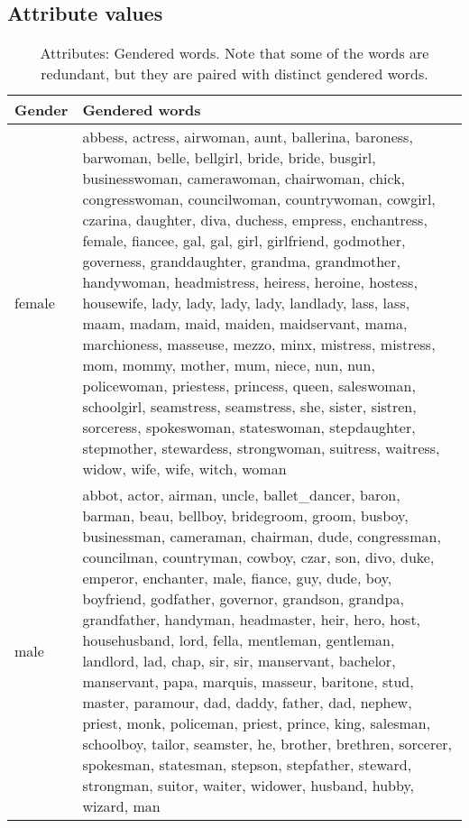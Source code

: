 {\renewcommand{\arraystretch}{1.5}
\subsection{Attribute values} \label{attribute-values}
\begin{table}[!htb]
    \small
    \centering
    \begin{tabular}{|p{}|p{}|}
    \hline
    \textbf{Gender} & \textbf{Gendered words}                        \\
    \hline    
    female          & abbess, actress, airwoman, aunt, ballerina, baroness, barwoman, belle, bellgirl, bride, bride, busgirl, businesswoman, camerawoman, chairwoman, chick, congresswoman, councilwoman, countrywoman, cowgirl, czarina, daughter, diva, duchess, empress, enchantress, female, fiancee, gal, gal, girl, girlfriend, godmother, governess, granddaughter, grandma, grandmother, handywoman, headmistress, heiress, heroine, hostess, housewife, lady, lady, lady, lady, landlady, lass, lass, maam, madam, maid, maiden, maidservant, mama, marchioness, masseuse, mezzo, minx, mistress, mistress, mom, mommy, mother, mum, niece, nun, nun, policewoman, priestess, princess, queen, saleswoman, schoolgirl, seamstress, seamstress, she, sister, sistren, sorceress, spokeswoman, stateswoman, stepdaughter, stepmother, stewardess, strongwoman, suitress, waitress, widow, wife, wife, witch, woman \\
    \hline
    male            & abbot, actor, airman, uncle, ballet\_dancer, baron, barman, beau, bellboy, bridegroom, groom, busboy, businessman, cameraman, chairman, dude, congressman, councilman, countryman, cowboy, czar, son, divo, duke, emperor, enchanter, male, fiance, guy, dude, boy, boyfriend, godfather, governor, grandson, grandpa, grandfather, handyman, headmaster, heir, hero, host, househusband, lord, fella, mentleman, gentleman, landlord, lad, chap, sir, sir, manservant, bachelor, manservant, papa, marquis, masseur, baritone, stud, master, paramour, dad, daddy, father, dad, nephew, priest, monk, policeman, priest, prince, king, salesman, schoolboy, tailor, seamster, he, brother, brethren, sorcerer, spokesman, statesman, stepson, stepfather, steward, strongman, suitor, waiter, widower, husband, hubby, wizard, man \\
    \hline
    \end{tabular}
    \captionsetup{justification=centering}
    \caption{Attributes: Gendered words. Note that some of the words are redundant, but they are paired with distinct gendered words.}
    \label{tab:attributes}
\end{table}
}

